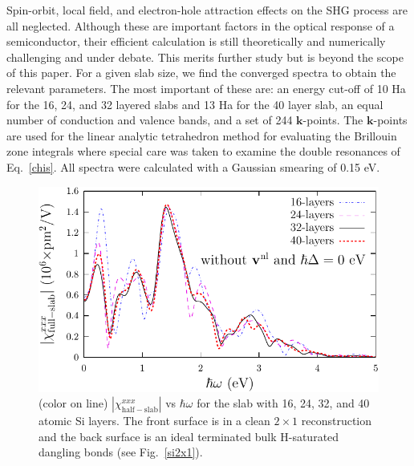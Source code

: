 \documentclass[floatfix,prb,aps,superscriptaddress,showpacs,11pt,preprint,letterpaper]{revtex4}
\begin{document}
Spin-orbit, local field, and electron-hole 
attraction\cite{beyond}
effects on the SHG process are all neglected.
Although these are important factors in the optical response of a semiconductor,
their efficient calculation is still theoretically and  
numerically challenging and  
under debate. This merits further study but is beyond the scope of this paper.
For a given slab size, we find the converged spectra 
to obtain the relevant parameters. The most important of 
these are: an energy cut-off of 10 Ha for the 16, 24, and 32 layered
slabs
and 13 Ha for the 40 layer slab,
an equal number of conduction and 
valence bands, and a set of 244 $\mathbf{k}$-points.
The $\mathbf{k}$-points are used for the linear analytic 
tetrahedron method for evaluating the
Brillouin zone integrals 
where special care was taken to examine the double resonances
of Eq.~\eqref{chis}. \cite{nastosPRB05}
All spectra were calculated with a Gaussian smearing of 0.15 eV.
\begin{figure}
\centering 
\includegraphics[scale=.8]{plots/fig1}
\caption{(color on line) 
$|\chi_{\mathrm{half-slab}}^{xxx}|$ vs $\hbar\omega$ 
for the slab
with 16, 24, 32, and 40 atomic Si layers. The front surface 
is in a clean $2\times 1$ reconstruction and the back 
surface is an ideal terminated bulk H-saturated dangling bonds (see Fig.~\ref{si2x1}).
\label{fig1}} 
\end{figure}
\end{document}
